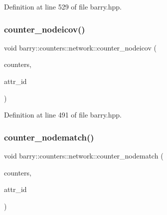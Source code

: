 Definition at line 529 of file barry.\+hpp.

\mbox{\label{namespacebarry_1_1counters_1_1network_aef48e4ae85d30c2a949006faee2b5bae}} 
\subsubsection{\texorpdfstring{counter\+\_\+nodeicov()}{counter\_nodeicov()}}
{\footnotesize\ttfamily void barry\+::counters\+::network\+::counter\+\_\+nodeicov (\begin{DoxyParamCaption}\item[{\hyperlink{namespacebarry_1_1counters_1_1network_a3b3c590303d47840d1967372ae495d95}{Net\+Counter\+Vector} $\ast$}]{counters,  }\item[{\hyperlink{namespacebarry_a11dfc53ddb4672278319aa04f1e09a6c}{uint}}]{attr\+\_\+id }\end{DoxyParamCaption})\hspace{0.3cm}{\ttfamily [inline]}}



Definition at line 491 of file barry.\+hpp.

\mbox{\label{namespacebarry_1_1counters_1_1network_ab0a33b2990950574552ab909e6847f96}} 
\subsubsection{\texorpdfstring{counter\+\_\+nodematch()}{counter\_nodematch()}}
{\footnotesize\ttfamily void barry\+::counters\+::network\+::counter\+\_\+nodematch (\begin{DoxyParamCaption}\item[{\hyperlink{namespacebarry_1_1counters_1_1network_a3b3c590303d47840d1967372ae495d95}{Net\+Counter\+Vector} $\ast$}]{counters,  }\item[{\hyperlink{namespacebarry_a11dfc53ddb4672278319aa04f1e09a6c}{uint}}]{attr\+\_\+id }\end{DoxyParamCaption})\hspace{0.3cm}{\ttfamily [inline]}}



